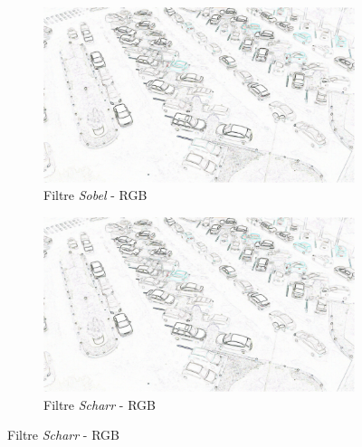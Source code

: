 \begin{figure}[H]
    \begin{subfigure}{.5\textwidth}
        \centering
        \includegraphics[width=.85\linewidth]{img/conception/image_process/edges_only/0.png}
        \caption{Filtre \textit{Sobel} - RGB}
    \end{subfigure}%
    \begin{subfigure}{.5\textwidth}
        \centering
        \includegraphics[width=.85\linewidth]{img/conception/image_process/edges_only/3.png}
        \caption{Filtre \textit{Scharr} - RGB}
    \end{subfigure}%


\end{figure}
